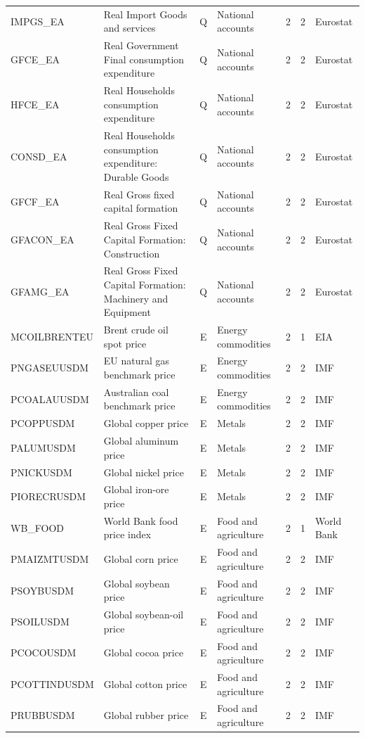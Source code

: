 \begin{longtable}{@{}l>{\raggedright\arraybackslash}p{7.4cm}clrr>{\raggedright\arraybackslash}p{2.6cm}@{}}
IMPGS\_EA & Real Import Goods and services & Q & National accounts & 2 & 2 & Eurostat \\
GFCE\_EA & Real Government Final consumption expenditure & Q & National accounts & 2 & 2 & Eurostat \\
HFCE\_EA & Real Households consumption expenditure & Q & National accounts & 2 & 2 & Eurostat \\
CONSD\_EA & Real Households consumption expenditure: Durable Goods & Q & National accounts & 2 & 2 & Eurostat \\
GFCF\_EA & Real Gross fixed capital formation & Q & National accounts & 2 & 2 & Eurostat \\
GFACON\_EA & Real Gross Fixed Capital Formation: Construction & Q & National accounts & 2 & 2 & Eurostat \\
GFAMG\_EA & Real Gross Fixed Capital Formation: Machinery and Equipment & Q & National accounts & 2 & 2 & Eurostat \\
MCOILBRENTEU & Brent crude oil spot price & E & Energy commodities & 2 & 1 & EIA \\
PNGASEUUSDM & EU natural gas benchmark price & E & Energy commodities & 2 & 2 & IMF \\
PCOALAUUSDM & Australian coal benchmark price & E & Energy commodities & 2 & 2 & IMF \\
PCOPPUSDM & Global copper price & E & Metals & 2 & 2 & IMF \\
PALUMUSDM & Global aluminum price & E & Metals & 2 & 2 & IMF \\
PNICKUSDM & Global nickel price & E & Metals & 2 & 2 & IMF \\
PIORECRUSDM & Global iron-ore price & E & Metals & 2 & 2 & IMF \\
WB\_FOOD & World Bank food price index & E & Food and agriculture & 2 & 1 & World Bank \\
PMAIZMTUSDM & Global corn price & E & Food and agriculture & 2 & 2 & IMF \\
PSOYBUSDM & Global soybean price & E & Food and agriculture & 2 & 2 & IMF \\
PSOILUSDM & Global soybean-oil price & E & Food and agriculture & 2 & 2 & IMF \\
PCOCOUSDM & Global cocoa price & E & Food and agriculture & 2 & 2 & IMF \\
PCOTTINDUSDM & Global cotton price & E & Food and agriculture & 2 & 2 & IMF \\
PRUBBUSDM & Global rubber price & E & Food and agriculture & 2 & 2 & IMF \\

\end{longtable}
